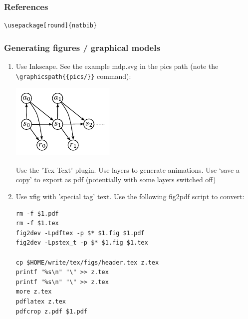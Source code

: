 \subsubsection{References}

\begin{code}
\begin{verbatim}
\usepackage[round]{natbib}

\end{verbatim}
\end{code}

\subsubsection{Generating figures / graphical models}

\begin{enumerate}

\item Use Inkscape. See the example mdp.svg in the pics path (note
the \verb+\graphicspath{{pics/}}+ command):

\centerline{\includegraphics[scale=.5]{mdp}}


  Use the 'Tex Text' plugin. Use layers to generate animations. Use
  `save a copy' to export as pdf (potentially with some layers
  switched off)

\item Use xfig with 'special tag' text. Use the following fig2pdf script to
  convert:

\begin{code}
\begin{verbatim}
rm -f $1.pdf
rm -f $1.tex
fig2dev -Lpdftex -p $* $1.fig $1.pdf
fig2dev -Lpstex_t -p $* $1.fig $1.tex

cp $HOME/write/tex/figs/header.tex z.tex
printf "%s\n" "\" >> z.tex
printf "%s\n" "\" >> z.tex
more z.tex
pdflatex z.tex
pdfcrop z.pdf $1.pdf
\end{verbatim}
\end{code}
\end{enumerate}



